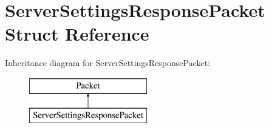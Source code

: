 \hypertarget{struct_server_settings_response_packet}{}\section{Server\+Settings\+Response\+Packet Struct Reference}
\label{struct_server_settings_response_packet}
Inheritance diagram for Server\+Settings\+Response\+Packet\+:\begin{figure}[H]
\begin{center}
\leavevmode
\includegraphics[height=2.000000cm]{struct_server_settings_response_packet}
\end{center}
\end{figure}
